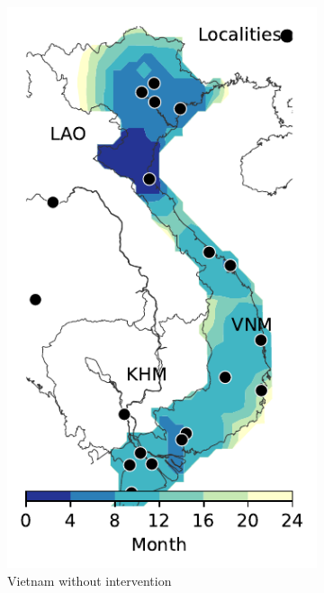 \documentclass[11pt]{article}
\theoremstyle{definition}
\begin{document}
\begin{figure}[ht]
\begin{subfigure}[b]{.28\textwidth}
\includegraphics[width=\textwidth]{../cellular_automata/results/contour/VN_model-B_precip1_m1_l3.pdf}
\caption{Vietnam without intervention\label{fig:vnmBContour}}
\end{subfigure}
\begin{subfigure}[b]{.28\textwidth}

\end{subfigure}
\end{figure}
\end{document}
